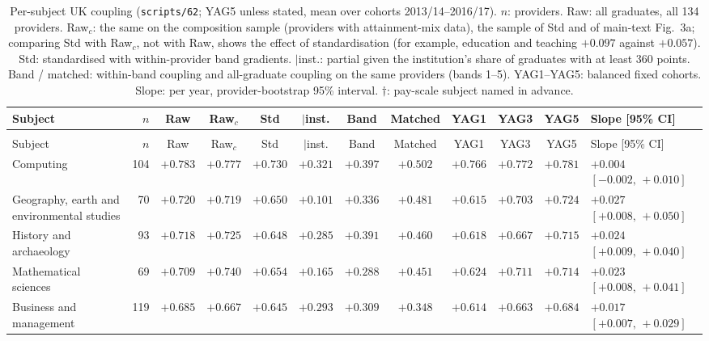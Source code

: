 \documentclass[11pt]{article}
\newcommand{\scr}[1]{\texttt{scripts/#1}}
\begin{document}
{\scriptsize
\setlength{\tabcolsep}{2.5pt}
\begin{longtable}{@{}>{\raggedright\arraybackslash}p{2.5cm}rcccccccccl@{}}
\caption{Per-subject UK coupling (\scr{62}; YAG5 unless stated, mean over cohorts 2013/14--2016/17). $n$: providers.
Raw: all graduates, all 134 providers. Raw$_c$: the same on the composition sample (providers with
attainment-mix data), the sample of Std and of main-text Fig.~3a; comparing Std with Raw$_c$, not with Raw, shows
the effect of standardisation (for example, education and teaching $+0.097$ against $+0.057$). Std:
standardised with within-provider band gradients. $\mid$inst.: partial given the institution's share of
graduates with at least 360 points. Band / matched: within-band coupling and all-graduate coupling on the same
providers (bands 1--5). YAG1--YAG5: balanced fixed cohorts. Slope: per year, provider-bootstrap 95\% interval.
$\dagger$: pay-scale subject named in advance.}\label{tab:uksubjects}\\
\toprule
Subject & $n$ & Raw & Raw$_c$ & Std & $\mid$inst. & Band & Matched & YAG1 & YAG3 & YAG5 & Slope [95\% CI] \\
\midrule
\endfirsthead
\multicolumn{12}{@{}l}{\small Table~\ref{tab:uksubjects} (continued)}\\
\toprule
Subject & $n$ & Raw & Raw$_c$ & Std & $\mid$inst. & Band & Matched & YAG1 & YAG3 & YAG5 & Slope [95\% CI] \\
\midrule
\endhead
\bottomrule
\endfoot
Computing & 104 & ${+}0.783$ & ${+}0.777$ & ${+}0.730$ & ${+}0.321$ & ${+}0.397$ & ${+}0.502$ & ${+}0.766$ & ${+}0.772$ & ${+}0.781$ & ${+}0.004$ $[{-}0.002,\,{+}0.010]$ \\
Geography, earth and environmental studies & 70 & ${+}0.720$ & ${+}0.719$ & ${+}0.650$ & ${+}0.101$ & ${+}0.336$ & ${+}0.481$ & ${+}0.615$ & ${+}0.703$ & ${+}0.724$ & ${+}0.027$ $[{+}0.008,\,{+}0.050]$ \\
History and archaeology & 93 & ${+}0.718$ & ${+}0.725$ & ${+}0.648$ & ${+}0.285$ & ${+}0.391$ & ${+}0.460$ & ${+}0.618$ & ${+}0.667$ & ${+}0.715$ & ${+}0.024$ $[{+}0.009,\,{+}0.040]$ \\
Mathematical sciences & 69 & ${+}0.709$ & ${+}0.740$ & ${+}0.654$ & ${+}0.165$ & ${+}0.288$ & ${+}0.451$ & ${+}0.624$ & ${+}0.711$ & ${+}0.714$ & ${+}0.023$ $[{+}0.008,\,{+}0.041]$ \\
Business and management & 119 & ${+}0.685$ & ${+}0.667$ & ${+}0.645$ & ${+}0.293$ & ${+}0.309$ & ${+}0.348$ & ${+}0.614$ & ${+}0.663$ & ${+}0.684$ & ${+}0.017$ $[{+}0.007,\,{+}0.029]$ \\

\end{longtable}}
\end{document}
